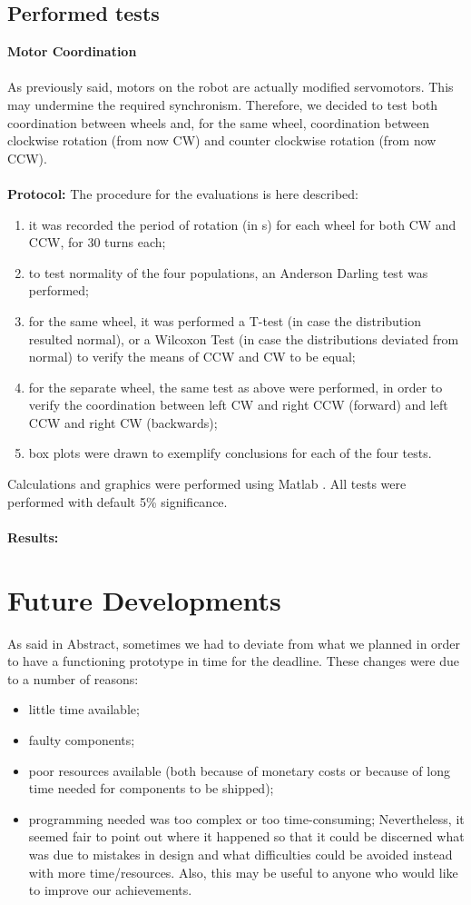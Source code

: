 \documentclass[a4paper,twoside]{book}
\begin{document}
\section{Performed tests}
\textbf{Motor Coordination}
\\
\\
As previously said, motors on the robot are actually modified servomotors. This may undermine the required synchronism. Therefore, we decided to test both coordination between wheels and, for the same wheel, coordination between clockwise rotation (from now CW) and counter clockwise rotation (from now CCW). 
\\
\\
\textbf{Protocol:}
The procedure for the evaluations is here described:
\begin{enumerate}
\item it was recorded the period of rotation (in s) for each wheel for both CW and CCW, for 30 turns each;
\item to test normality of the four populations, an Anderson Darling test was performed;
\item for the same wheel, it was performed a T-test (in case the distribution resulted normal), or a Wilcoxon Test (in case the distributions deviated from normal) to verify the means of CCW and CW to be equal;
\item for the separate wheel, the same test as above were performed, in order to verify the coordination between left CW and right CCW (forward) and left CCW and right CW (backwards);
\item box plots were drawn to exemplify conclusions for each of the four tests.
\end{enumerate}
Calculations and graphics were performed using Matlab \textregistered. All tests were performed with default 5\% significance.
\\
\\
\textbf{Results:}

\chapter{Future Developments}

As said in Abstract, sometimes we had to deviate from what we planned in order to have a functioning prototype in time for the deadline. These changes were due to a number of reasons:

\begin{itemize}
\item little time available;
\item faulty components;
\item poor resources available (both because of monetary costs or because of long time needed for components to be shipped);
\item programming needed was too complex or too time-consuming;
Nevertheless, it seemed fair to point out where it happened so that it could be discerned what was due to mistakes in design and what difficulties could be avoided instead with more time/resources. Also, this may be useful to anyone who would like to improve our achievements.
\end{itemize}
\end{document}
